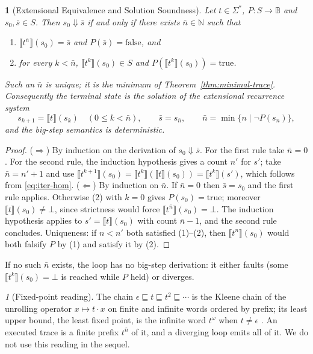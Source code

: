 \documentclass[oneside,english]{amsart}
\numberwithin{equation}{section}
\numberwithin{figure}{section}
\theoremstyle{plain}
\newtheorem{thm}{\protect\theoremname}
\theoremstyle{definition}
\theoremstyle{plain}
\theoremstyle{remark}
\newtheorem*{rem*}{\protect\remarkname}
\theoremstyle{plain}
\theoremstyle{definition}
\theoremstyle{plain}
\theoremstyle{remark}
\newcommand{\sem}[1]{\llbracket #1 \rrbracket}
\newcommand{\bigstep}{\Downarrow}
\providecommand{\remarkname}{Remark}
\providecommand{\theoremname}{Theorem}
\begin{document}
\begin{thm}[Extensional Equivalence and Solution Soundness]
\label{thm:extensional-equivalence}
Let $t \in \Sigma^*$, $P : S \to \mathbb{B}$ and $s_0, \bar{s} \in S$. Then $s_0 \bigstep \bar{s}$ if and only if there exists $\bar{n} \in \mathbb{N}$ such that
\begin{enumerate}
    \item $\sem{t^{\bar{n}}}(s_0) = \bar{s}$ and $P(\bar{s}) = \text{false}$, and
    \item for every $k < \bar{n}$, $\sem{t^{k}}(s_0) \in S$ and $P(\sem{t^{k}}(s_0)) = \text{true}$.
\end{enumerate}
Such an $\bar{n}$ is unique; it is the minimum of Theorem~\ref{thm:minimal-trace}. Consequently the terminal state is the solution of the extensional recurrence system
\[
s_{k+1} = \sem{t}(s_k) \quad (0 \le k < \bar{n}), \qquad \bar{s} = s_{\bar{n}}, \qquad \bar{n} = \min \{ n \mid \neg P(s_n) \},
\]
and the big-step semantics is deterministic.
\end{thm}

\begin{proof}
($\Rightarrow$) By induction on the derivation of $s_0 \bigstep \bar{s}$. For the first rule take $\bar{n} = 0$. For the second rule, the induction hypothesis gives a count $n'$ for $s'$; take $\bar{n} = n' + 1$ and use $\sem{t^{k+1}}(s_0) = \sem{t^{k}}(\sem{t}(s_0)) = \sem{t^k}(s')$, which follows from \eqref{eq:iter-hom}. ($\Leftarrow$) By induction on $\bar{n}$. If $\bar{n} = 0$ then $\bar{s} = s_0$ and the first rule applies. Otherwise (2) with $k = 0$ gives $P(s_0) = \text{true}$; moreover $\sem{t}(s_0) \neq \bot$, since strictness would force $\sem{t^{\bar{n}}}(s_0) = \bot$. The induction hypothesis applies to $s' = \sem{t}(s_0)$ with count $\bar{n} - 1$, and the second rule concludes. Uniqueness: if $n < n'$ both satisfied (1)--(2), then $\sem{t^n}(s_0)$ would both falsify $P$ by (1) and satisfy it by (2).
\end{proof}

If no such $\bar{n}$ exists, the loop has no big-step derivation: it either faults (some $\sem{t^k}(s_0) = \bot$ is reached while $P$ held) or diverges.

\begin{rem*}[Fixed-point reading]
The chain $\epsilon \sqsubseteq t \sqsubseteq t^2 \sqsubseteq \cdots$ is the Kleene chain of the unrolling operator $x \mapsto t \cdot x$ on finite and infinite words ordered by prefix; its least upper bound, the least fixed point, is the infinite word $t^\omega$ when $t \ne \epsilon$ \cite{winskel1993formal}. An executed trace is a finite prefix $t^{\bar{n}}$ of it, and a diverging loop emits all of it. We do not use this reading in the sequel.
\end{rem*}
\end{document}
